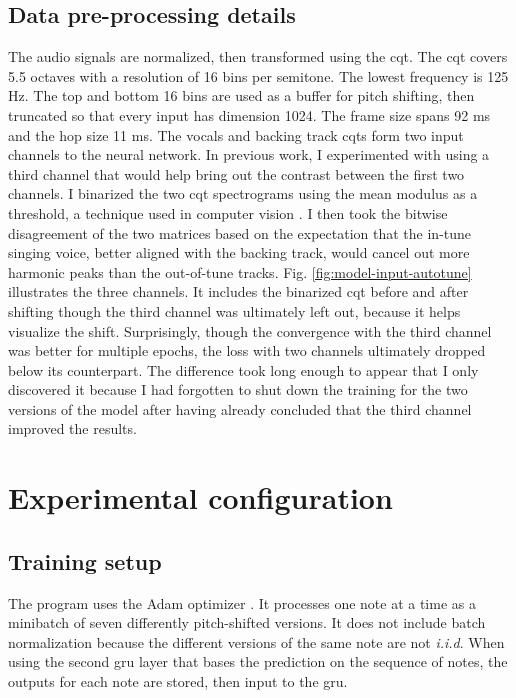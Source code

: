 \subsection{Data pre-processing details}
\label{sec:data-format-autotune}
The audio signals are normalized, then transformed using the \gls{cqt}. The \gls{cqt} covers 5.5 octaves with a resolution of 16 bins per semitone. The lowest frequency is 125 Hz. The top and bottom 16 bins are used as a buffer for pitch shifting, then truncated so that every input has dimension 1024. The frame size spans 92 ms and the hop size 11 ms. The vocals and backing track \gls{cqt}s form two input channels to the neural network. In previous work, I experimented with using a third channel that would help bring out the contrast between the first two channels. I binarized the two \gls{cqt} spectrograms using the mean modulus as a threshold, a technique used in computer vision \cite{sezgin2004survey}. I then took the bitwise disagreement of the two matrices based on the expectation that the in-tune singing voice, better aligned with the backing track, would cancel out more harmonic peaks than the out-of-tune tracks. Fig. \ref{fig:model-input-autotune} illustrates the three channels. It includes the binarized \gls{cqt} before and after shifting though the third channel was ultimately left out, because it helps visualize the shift. Surprisingly, though the convergence with the third channel was better for multiple epochs, the loss with two channels ultimately dropped below its counterpart. The difference took long enough to appear that I only discovered it because I had forgotten to shut down the training for the two versions of the model after having already concluded that the third channel improved the results. 

\section{Experimental configuration}
\label{sec:experiments-autotune}
\subsection{Training setup}
The program uses the Adam optimizer \cite{kingma2014adam}. It processes one note at a time as a minibatch of seven differently pitch-shifted versions. It does not include batch normalization because the different versions of the same note are not \textit{i.i.d}. When using the second \gls{gru} layer that bases the prediction on the sequence of notes, the outputs for each note are stored, then input to the \gls{gru}. 

